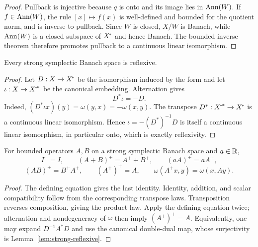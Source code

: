 \begin{proof}
Pullback is injective because $q$ is onto and its image lies in $\operatorname{Ann}(W)$. If
$f\in\operatorname{Ann}(W)$, the rule $[x]\mapsto f(x)$ is well-defined and bounded for the quotient norm, and
is inverse to pullback. Since $W$ is closed, $X/W$ is Banach, while $\operatorname{Ann}(W)$ is a closed
subspace of ${X}^{\!*}$ and hence Banach. The bounded inverse theorem therefore promotes
pullback to a continuous linear isomorphism.
\end{proof}

\begin{lemma}\label{lem:strong-reflexive}
Every strong symplectic Banach space is reflexive.
\leanok
\end{lemma}

\begin{proof}
Let $D:X\to{X}^{\!*}$ be the isomorphism induced by the form and let
$\iota:X\to{{X}^{\!*}}^{\!*}$ be the canonical embedding. Alternation gives
\[
  D^*\iota=-D.
\]
Indeed, $(D^*\iota x)(y)=\omega(y,x)=-\omega(x,y)$. The transpose
$D^*:{{X}^{\!*}}^{\!*}\to{X}^{\!*}$ is a continuous linear isomorphism. Hence
$\iota=-(D^*)^{-1}D$ is itself a continuous linear isomorphism, in particular onto, which is
exactly reflexivity.
\end{proof}

\begin{lemma}\label{lem:adjoint-calculus}
For bounded operators $A,B$ on a strong symplectic Banach space and $a\in\mathbb R$,
\[
 I^+=I,\qquad (A+B)^+=A^++B^+,\qquad (aA)^+=aA^+,
\]
\[
 (AB)^+=B^+A^+,\qquad (A^+)^+=A,\qquad
 \omega(A^+x,y)=\omega(x,Ay).
\]
\leanok
\end{lemma}

\begin{proof}
The defining equation gives the last identity. Identity, addition, and scalar compatibility follow
from the corresponding transpose laws. Transposition reverses composition, giving the product
law. Apply the defining equation twice; alternation and nondegeneracy of $\omega$ then imply
$(A^+)^+=A$. Equivalently, one may expand $D^{-1}A^*D$ and use the canonical double-dual map,
whose surjectivity is Lemma~\ref{lem:strong-reflexive}.
\end{proof}

